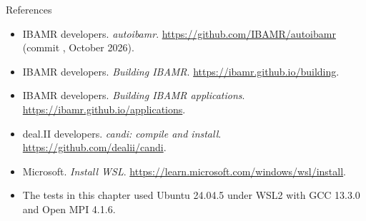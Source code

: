\documentclass[aspectratio=169,11pt]{beamer}
\begin{document}
\begin{frame}{References}
\small
\begin{itemize}
  \item IBAMR developers. \emph{autoibamr}. \url{https://github.com/IBAMR/autoibamr} (commit , October 2026).
  \item IBAMR developers. \emph{Building IBAMR}. \url{https://ibamr.github.io/building}.
  \item IBAMR developers. \emph{Building IBAMR applications}. \url{https://ibamr.github.io/applications}.
  \item deal.II developers. \emph{candi: compile and install}. \url{https://github.com/dealii/candi}.
  \item Microsoft. \emph{Install WSL}. \url{https://learn.microsoft.com/windows/wsl/install}.
  \item The tests in this chapter used Ubuntu 24.04.5 under WSL2 with GCC 13.3.0 and Open MPI 4.1.6.
\end{itemize}
\end{frame}
\end{document}
